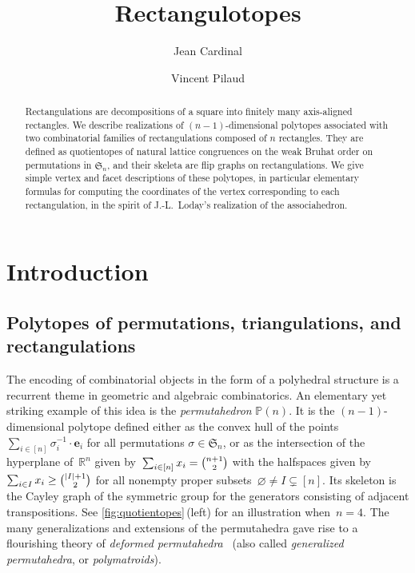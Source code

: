 \documentclass{amsart}
\title{Rectangulotopes}
\author{Jean Cardinal}
\author{Vincent Pilaud}
\theoremstyle{definition}
\newcommand{\R}{\mathbb{R}} %
\renewcommand{\b}[1]{{\boldsymbol{#1}}} %
\newcommand{\f}[1]{\mathfrak{#1}} %
\newcommand{\darkblue}{\color{darkblue}} %
\newcommand{\defn}[1]{\textsl{\darkblue #1}} %
\newcommand{\polytope}[1]{\mathds{#1}} %
\newcommand{\Perm}{\polytope{P}} %
\begin{document}
\begin{abstract}
  Rectangulations are decompositions of a square into finitely many axis-aligned rectangles.
  We describe realizations of $(n-1)$-dimensional polytopes associated with two combinatorial families of rectangulations composed of $n$ rectangles.
  They are defined as quotientopes of natural lattice congruences on the weak Bruhat order on permutations in $\f{S}_n$, and their skeleta are flip graphs on rectangulations.
  We give simple vertex and facet descriptions of these polytopes, in particular elementary formulas for computing the coordinates of the vertex corresponding to each rectangulation, in the spirit of J.-L.~Loday's realization of the associahedron.
\end{abstract}

\maketitle

\tableofcontents


\section{Introduction}
\label{sec:intro}


\subsection{Polytopes of permutations, triangulations, and rectangulations}
\label{subsec:permTrianRect}

The encoding of combinatorial objects in the form of a polyhedral structure is a recurrent theme in geometric and algebraic combinatorics.
An elementary yet striking example of this idea is the \defn{permutahedron} $\Perm (n)$.
It is the $(n-1)$-dimensional polytope defined either as the convex hull of the points $\sum_{i\in [n]} \sigma^{-1}_i\cdot \b{e}_i$ for all permutations $\sigma \in \f{S}_n$, or as the intersection of the hyperplane of~$\R^n$ given by~$\sum_{i \in [n]} x_i = \smash{\binom{n+1}{2}}$ with the halfspaces given by~$\sum_{i \in I} x_i \ge \smash{\binom{|I|+1}{2}}$ for all nonempty proper subsets~$\varnothing \ne I \subsetneq [n]$.
Its skeleton is the Cayley graph of the symmetric group for the generators consisting of adjacent transpositions.
See \cref{fig:quotientopes}\,(left) for an illustration when~$n = 4$.
The many generalizations and extensions of the permutahedra gave rise to a flourishing theory of \defn{deformed permutahedra}~\cite{Postnikov,MR2520477,MR4064768,MR4651496} (also called \defn{generalized permutahedra}, or \defn{polymatroids}).
\end{document}
